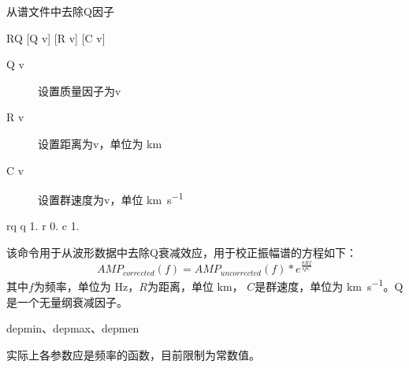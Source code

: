 \label{cmd:rq}

从谱文件中去除Q因子

\begin{SACSTX}
RQ [Q v] [R v] [C v]
\end{SACSTX}

\begin{description}
\item [Q v] 设置质量因子为v
\item [R v] 设置距离为v，单位为 \si{\km}
\item [C v] 设置群速度为v，单位 \si{\km\per\s}
\end{description}

\begin{SACDFT}
rq q 1. r 0. c 1.
\end{SACDFT}

该命令用于从波形数据中去除Q衰减效应，用于校正振幅谱的方程如下：
\[ AMP_{corrected}(f) = AMP_{uncorrected}(f) * e^{\frac{\pi R f}{Q C}} \]
其中$f$为频率，单位为 \si{\Hz}，$R$为距离，单位 \si{\km}，
$C$是群速度，单位为 \si{\km\per\s}。Q是一个无量纲衰减因子。

depmin、depmax、depmen

实际上各参数应是频率的函数，目前限制为常数值。
